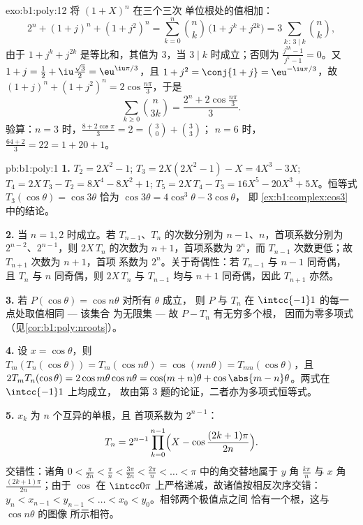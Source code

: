 \begin{solution}{exo:b1:poly:12}
将 $(1 + X)^n$ 在三个三次
单位根处的值相加：
\[
2^n + (1 + j)^n + (1 + j^2)^n
= \sum_{k=0}^n \binom nk\,\bigl(1 + j^k + j^{2k}\bigr)
= 3\sum_{k\,:\,3\mid k}\binom nk ,
\]
由于 $1 + j^k + j^{2k}$ 是等比和，其值为 $3$，当 $3
\mid k$ 时成立；否则为 $\frac{j^{3k} - 1}{j^k - 1} = 0$。又 $1 +
j = \frac12 + \iu\frac{\sqrt3}2 = \eu^{\iu\pi/3}$，且 $1 + j^2 =
\conj{1 + j} = \eu^{-\iu\pi/3}$，故 $(1+j)^n + (1+j^2)^n =
2\cos\frac{n\pi}3$，于是
\[
\sum_{k\geq0}\binom n{3k} = \frac{2^n + 2\cos\frac{n\pi}3}{3} .
\]
验算：$n = 3$ 时，$\frac{8 + 2\cos\pi}3 = 2 = \binom30 + \binom33$；
$n = 6$ 时，$\frac{64 + 2}3 = 22 = 1 + 20 + 1$。
\end{solution}

\begin{solution}{pb:b1:poly:1}
\textbf{1.} $T_2 = 2X^2 - 1$; $T_3 = 2X(2X^2 - 1) - X = 4X^3 -
3X$; $T_4 = 2X\,T_3 - T_2 = 8X^4 - 8X^2 + 1$; $T_5 = 2X\,T_4 - T_3
= 16X^5 - 20X^3 + 5X$。恒等式 $T_3(\cos\theta) = \cos3\theta$
恰为 $\cos3\theta = 4\cos^3\theta - 3\cos\theta$，
即 \cref{ex:b1:complex:cos3} 中的结论。

\textbf{2.} 当 $n = 1, 2$ 时成立。若 $T_{n-1}$、$T_n$ 的次数分别为
$n-1$、$n$，首项系数分别为 $2^{n-2}$、$2^{n-1}$，则
$2X\,T_n$ 的次数为 $n+1$，首项系数为 $2^n$，而
$T_{n-1}$ 次数更低；故 $T_{n+1}$ 次数为 $n + 1$，首项
系数为 $2^n$。关于奇偶性：若 $T_{n-1}$ 与 $n - 1$ 同奇偶，
且 $T_n$ 与 $n$ 同奇偶，则 $2X\,T_n$ 与 $T_{n-1}$ 均与
$n + 1$ 同奇偶，因此 $T_{n+1}$ 亦然。

\textbf{3.} 若 $P(\cos\theta) = \cos n\theta$ 对所有 $\theta$ 成立，
则 $P$ 与 $T_n$ 在 $\intcc{-1}1$ 的每一点处取值相同 --- 该集合
为无限集 --- 故 $P - T_n$ 有无穷多个根，
因而为零多项式（见\cref{cor:b1:poly:nroots}）。

\textbf{4.} 设 $x = \cos\theta$，则 $T_m(T_n(\cos\theta)) =
T_m(\cos n\theta) = \cos(mn\theta) = T_{mn}(\cos\theta)$，且
$2T_mT_n(\cos\theta) = 2\cos m\theta\cos n\theta = \cos(m+n)\theta
+ \cos\abs{m - n}\theta$。两式在 $\intcc{-1}1$ 上均成立，
故由第 3 题的论证，二者亦为多项式恒等式。

\textbf{5.} $x_k$ 为 $n$ 个互异的单根，且
首项系数为 $2^{n-1}$：
\[
T_n = 2^{n-1}\prod_{k=0}^{n-1}
\Bigl(X - \cos\frac{(2k+1)\pi}{2n}\Bigr) .
\]
交错性：诸角 $0 < \frac{\pi}{2n} < \frac\pi n <
\frac{3\pi}{2n} < \frac{2\pi}n < \dots < \pi$ 中的角交替地属于
$y$ 角 $\frac{k\pi}n$ 与 $x$ 角
$\frac{(2k+1)\pi}{2n}$；由于 $\cos$ 在
$\intcc0\pi$ 上严格递减，故诸值按相反次序交错：$y_n <
x_{n-1} < y_{n-1} < \dots < x_0 < y_0$。相邻两个极值点之间
恰有一个根，这与 $\cos n\theta$ 的图像
所示相符。


\end{solution}
